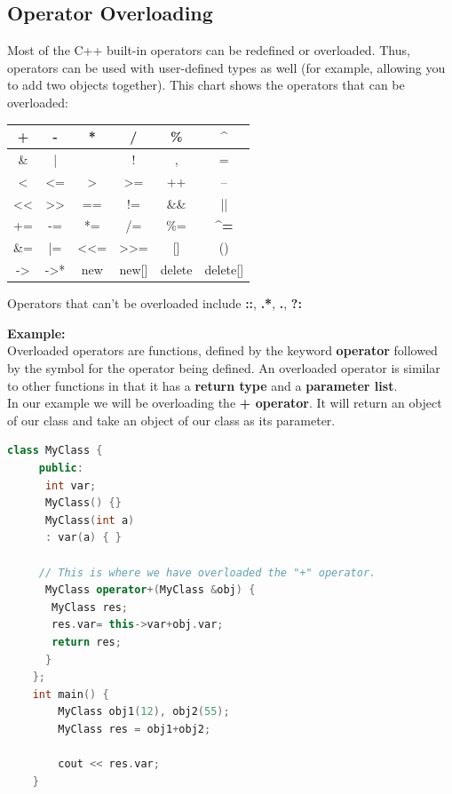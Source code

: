 \documentclass[12pt , a4paper]{article}
\newcommand{\hl}[1]{\colorbox{coolblack}{\color{cream}\textbf{#1}\color{black}}}
\begin{document}
	\subsection{Operator Overloading}
	Most of the C++ built-in operators can be redefined or overloaded.
	Thus, operators can be used with user-defined types as well (for example, allowing you to add two objects together).
	This chart shows the operators that can be overloaded:\\
	\begin{center}
		\begin{tabular}{ c | c | c | c | c | c }
		\hline 
		+ 		& - 		& * 		&/ 		& \% 		&  \textbf{\^}  \\ \hline
		\& 	& | 		& ~ 		& ! 		& , 		& = \\ \hline
		< 		& <= 	& > 		& >= 	& ++ 	& -- \\ \hline
		<< 	& >> 	& == 	& != 		& \&\& 	& || \\ \hline
		+= 	& -= 		& *= 		& /= 		& \%= 	& \textbf{\^}\textbf{=} \\ \hline
		\&= 	& |= 		& <<= 	& >>= 	& [] 		& () \\ \hline
		-> 	& ->* 	& new 	& new[] 	& delete 	& delete[] \\ \hline
		\end{tabular}
	\end{center}

Operators that can't be overloaded include \hl{::},  \hl{.*}, \hl{.}, \hl{?:}
	\begin{tcolorbox}
	\textbf{Example:}\\
	Overloaded operators are functions, defined by the keyword \textbf{operator} followed by the symbol for the operator being defined.
	An overloaded operator is similar to other functions in that it has a \textbf{return type} and a \textbf{parameter list}.\\
	In our example we will be overloading the \textbf{+ operator}. It will return an object of our class and take an object of our class as its parameter.
	\end{tcolorbox}

	\begin{lstlisting}[language=C++]
	class MyClass {
	 public:
	  int var;
	  MyClass() {}
	  MyClass(int a)
	  : var(a) { }
	
	 // This is where we have overloaded the "+" operator. 
	  MyClass operator+(MyClass &obj) {
	   MyClass res;
	   res.var= this->var+obj.var;
	   return res; 
	  }
	};
	int main() {
	    MyClass obj1(12), obj2(55);
	    MyClass res = obj1+obj2;
	
	    cout << res.var;
	}
	\end{lstlisting}
\end{document}
